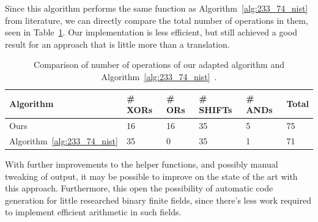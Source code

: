 Since this algorithm performs the same function as Algorithm~\ref{alg:233_74_nist} from literature, we can directly compare the total number of operations in them, seen in Table~\ref{table:comparison:nist}. Our implementation is less efficient, but still achieved a good result for an approach that is little more than a translation. \\

\begin{table}
\centering
\caption{Comparison of number of operations of our adapted algorithm and Algorithm~\ref{alg:233_74_nist}~\cite[p. 55]{hankerson2006guide}.}
{\begin{tabular}{l l l l l l} \label{table:comparison:nist}
Algorithm & \# XORs & \# ORs & \# SHIFTs & \# ANDs & Total \\ \hline
Ours & 16 & 16 & 35 & 5 & 75 \\ \hline
Algorithm~\ref{alg:233_74_nist} & 35 & 0 & 35 & 1 & 71
\end{tabular}}{}
\end{table}

With further improvements to the helper functions, and possibly manual tweaking of output, it may be possible to improve on the state of the art with this approach. Furthermore, this open the possibility of automatic code generation for little researched binary finite fields, since there's less work required to implement efficient arithmetic in such fields.